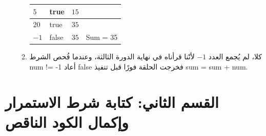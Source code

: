 \documentclass[14pt]{extarticle}
\begin{document}
\begin{enumerate}[itemsep=2em]
\begin{boxSolution}
\begin{enumerate}
\begin{center}
\begin{english}
\begin{tabular}{|C{2.5cm}|C{3.5cm}|C{2.5cm}|C{3.5cm}|}
    $5$ & \textenglish{true} & $15$ & \\ \hline
    $20$ & \textenglish{true} & $35$ & \\ \hline
    $-1$ & \textenglish{false} & $35$ & \textenglish{Sum = 35} \\ \hline
    \end{tabular}
    \end{english}
    \end{center}
    \item كلا، لم يُجمع العدد $-1$ لأنّنا قرأناه في نهاية الدورة الثالثة، وعندما فُحص الشرط \textenglish{num != -1} أعاد \textenglish{false} فخرجت الحلقة فورًا قبل تنفيذ \textenglish{sum = sum + num}.
\end{enumerate}
\end{boxSolution}
\fi
\filbreak

\end{enumerate}

\clearpage
\section*{القسم الثاني: كتابة شرط الاستمرار وإكمال الكود الناقص}
\end{document}
